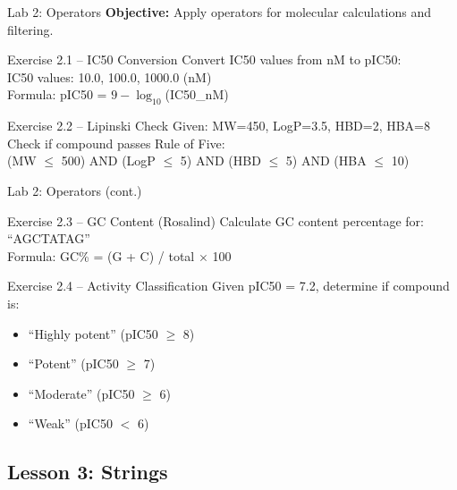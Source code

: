 \documentclass{beamer}
\begin{document}
\begin{frame}{\textcolor{labcolor}{Lab 2: Operators}}
    \small
    \textbf{Objective:} Apply operators for molecular calculations and filtering.
    \vspace{0.5em}
    \begin{block}{Exercise 2.1 -- IC50 Conversion}
        Convert IC50 values from nM to pIC50:\\
        IC50 values: 10.0, 100.0, 1000.0 (nM)\\
        Formula: pIC50 = $9 - \log_{10}$(IC50\_nM)
    \end{block}
    \vspace{0.5em}
    \begin{block}{Exercise 2.2 -- Lipinski Check}
        Given: MW=450, LogP=3.5, HBD=2, HBA=8\\
        Check if compound passes Rule of Five:\\
        (MW $\leq$ 500) AND (LogP $\leq$ 5) AND (HBD $\leq$ 5) AND (HBA $\leq$ 10)
    \end{block}
\end{frame}

\begin{frame}{\textcolor{labcolor}{Lab 2: Operators (cont.)}}
    \small
    \begin{block}{Exercise 2.3 -- GC Content (Rosalind)}
        Calculate GC content percentage for: ``AGCTATAG''\\
        Formula: GC\% = (G + C) / total $\times$ 100
    \end{block}
    \vspace{0.5em}
    \begin{block}{Exercise 2.4 -- Activity Classification}
        Given pIC50 = 7.2, determine if compound is:
        \begin{itemize}
            \item ``Highly potent'' (pIC50 $\geq$ 8)
            \item ``Potent'' (pIC50 $\geq$ 7)
            \item ``Moderate'' (pIC50 $\geq$ 6)
            \item ``Weak'' (pIC50 $<$ 6)
        \end{itemize}
    \end{block}
\end{frame}

\subsection{Lesson 3: Strings}
\end{document}
